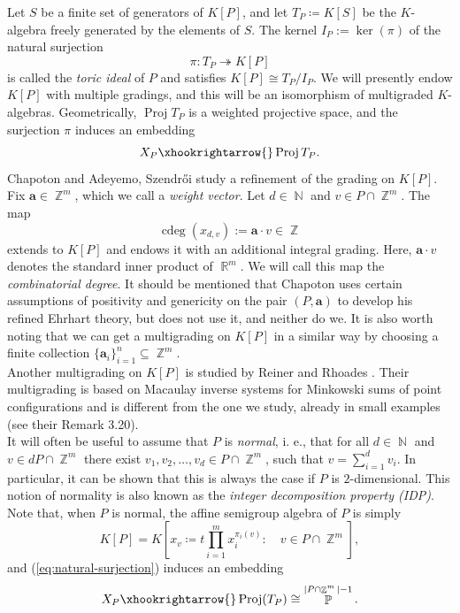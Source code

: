 \documentclass[a4paper,12pt]{amsart}
\theoremstyle{plain}
\theoremstyle{definition}
\theoremstyle{remark}
\DeclareMathOperator{\NN}{\mathbb{N}}
\DeclareMathOperator{\ZZ}{\mathbb{Z}}
\DeclareMathOperator{\RR}{\mathbb{R}}
\DeclareMathOperator{\PP}{\mathbb{P}}
\DeclareMathOperator{\cdeg}{cdeg}
\DeclareMathOperator{\Proj}{Proj}
\begin{document}
Let $S$ be a finite set of generators of $K[P]$, and let $T_P\coloneq K[S]$ be the $K$-algebra freely generated by the elements of $S$. The kernel $I_P := \ker(\pi)$ of the natural surjection
\begin{equation}\label{eq:natural-surjection}
    \pi: T_P \twoheadrightarrow K[P]
\end{equation}
is called the \emph{toric ideal} of $P$ and satisfies $K[P] \cong T_P/I_P$. We will presently endow $K[P]$ with multiple gradings, and this will be an isomorphism of multigraded $K$-algebras. Geometrically, $\Proj T_P$ is a weighted projective space, and the surjection $\pi$ induces an embedding
\[
X_P \xhookrightarrow{} \Proj T_P.
\]
Chapoton \cite{chapoton-analogues} and Adeyemo, Szendrői \cite{adeyemo-szendroi-refined} study a refinement of the grading on $K[P]$. Fix $\bm{a} \in \ZZ^m$, which we call a \emph{weight vector}. Let $d \in \NN$ and $v \in P \cap \ZZ^m$. The map
\[
\cdeg(x_{d, v}) := \bm{a} \cdot v \in \ZZ
\]
extends to $K[P]$ and endows it with an additional integral grading. Here, $\bm{a} \cdot v $ denotes the standard inner product of $\RR^m$. We will call this map the \emph{combinatorial degree}. It should be mentioned that Chapoton uses certain assumptions of positivity and genericity on the pair $(P, \bm{a})$ to develop his refined Ehrhart theory, but \cite{adeyemo-szendroi-refined} does not use it, and neither do we. It is also worth noting that we can get a multigrading on $K[P]$ in a similar way by choosing a finite collection $\{\bm{a}_i\}_{i = 1}^n \subseteq \ZZ^m$. \\

Another multigrading on $K[P]$ is studied by Reiner and Rhoades \cite{reiner-rhoades-harmonics}. Their multigrading is based on Macaulay inverse systems for Minkowski sums of point configurations and is different from the one we study, already in small examples (see their Remark 3.20). \\

It will often be useful to assume that $P$ is \emph{normal}, i. e., that for all $d \in \NN$ and $v \in dP \cap \ZZ^m$ there exist $v_1, v_2, \ldots, v_d \in P \cap \ZZ^m$, such that $v = \sum_{i = 1}^d v_i$. In particular, it can be shown that this is always the case if $P$ is $2$-dimensional. This notion of normality is also known as the \emph{integer decomposition property (IDP)}. Note that, when $P$ is normal, the affine semigroup algebra of $P$ is simply
\[
K[P] = K \left [ x_v \coloneq t\prod_{i = 1}^m x_i^{\pi_i(v)}: \quad v \in P \cap \ZZ^m \right ],
\]
and (\ref{eq:natural-surjection}) induces an embedding
\[
X_P \xhookrightarrow{} \Proj(T_P) \cong \PP^{|P \cap \ZZ^m| - 1}.
\]
\end{document}
